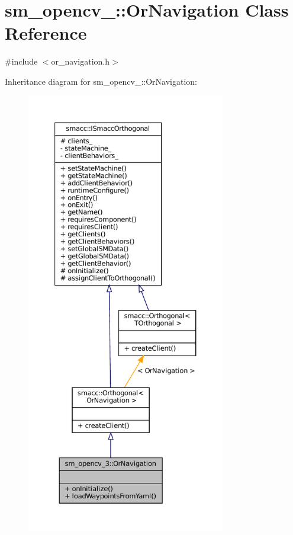 \hypertarget{classsm__opencv__3_1_1OrNavigation}{}\section{sm\+\_\+opencv\+\_\+:\+:Or\+Navigation Class Reference}
\label{classsm__opencv__3_1_1OrNavigation}


{\ttfamily \#include $<$or\+\_\+navigation.\+h$>$}



Inheritance diagram for sm\+\_\+opencv\+\_\+:\+:Or\+Navigation\+:
\nopagebreak
\begin{figure}[H]
\begin{center}
\leavevmode
\includegraphics[height=550pt]{classsm__opencv__3_1_1OrNavigation__inherit__graph}
\end{center}
\end{figure}


